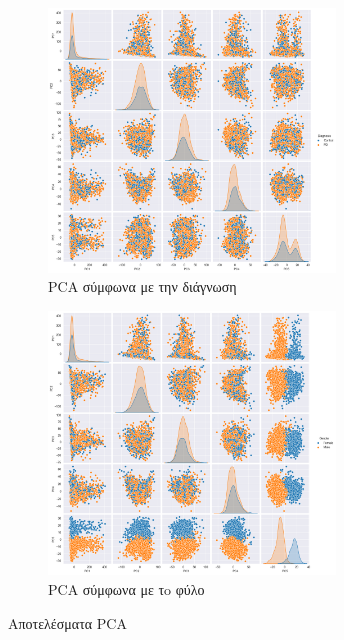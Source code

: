 \documentclass[12pt]{report}
\begin{document}
            \begin{figure}[ht]
                \centering
                \begin{subfigure}[b]{0.48\textwidth}
                    \centering
                    \includegraphics[width=\linewidth,height=7cm]{Chapter-2-Section-2.1/ppmi-pca-pd-ctrl-all-visits-hue_diagnosis.png}
                    \caption{PCA σύμφωνα με την διάγνωση}
                    \label{fig:ppmi-pca-pd-ctrl-all-visits-hue_diagnosis}                
                \end{subfigure}
                \hfill
                \begin{subfigure}[b]{0.48\textwidth}
                    \centering
                    \includegraphics[width=\linewidth,height=7cm]{Chapter-2-Section-2.1/ppmi-pca-pd-ctrl-all-visits-hue_gender.png}
                    \caption{PCA σύμφωνα με τo φύλο}
                    \label{fig:ppmi-pca-pd-ctrl-all-visits-hue_gender}    
                \end{subfigure}
                \label{fig:ppmi-pca-scatterplot}
                \caption{Αποτελέσματα PCA}
            \end{figure}
\end{document}
